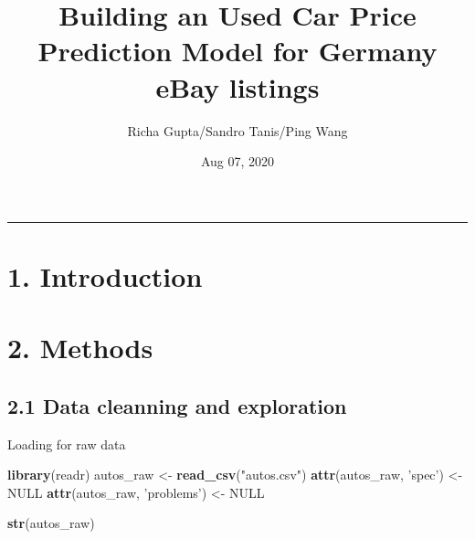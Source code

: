 \documentclass[]{article}
\title{Building an Used Car Price Prediction Model for Germany eBay listings}
\author{Richa Gupta/Sandro Tanis/Ping Wang}
\date{Aug 07, 2020}
\newenvironment{Shaded}{\begin{snugshade}}{\end{snugshade}}
\newcommand{\KeywordTok}[1]{\textcolor[rgb]{0.13,0.29,0.53}{\textbf{#1}}}
\newcommand{\NormalTok}[1]{#1}
\newcommand{\OtherTok}[1]{\textcolor[rgb]{0.56,0.35,0.01}{#1}}
\newcommand{\StringTok}[1]{\textcolor[rgb]{0.31,0.60,0.02}{#1}}
\begin{document}
\maketitle

\begin{center}\rule{0.5\linewidth}{\linethickness}\end{center}

\hypertarget{introduction}{%
\section{1. Introduction}\label{introduction}}

\hypertarget{methods}{%
\section{2. Methods}\label{methods}}

\hypertarget{data-cleanning-and-exploration}{%
\subsection{2.1 Data cleanning and
exploration}\label{data-cleanning-and-exploration}}

Loading for raw data

\begin{Shaded}
\begin{Highlighting}[]
\KeywordTok{library}\NormalTok{(readr)}
\NormalTok{autos_raw <-}\StringTok{ }\KeywordTok{read_csv}\NormalTok{(}\StringTok{"autos.csv"}\NormalTok{)}
\KeywordTok{attr}\NormalTok{(autos_raw, }\StringTok{'spec'}\NormalTok{) <-}\StringTok{ }\OtherTok{NULL}
\KeywordTok{attr}\NormalTok{(autos_raw, }\StringTok{'problems'}\NormalTok{) <-}\StringTok{ }\OtherTok{NULL}

\KeywordTok{str}\NormalTok{(autos_raw)}
\end{Highlighting}
\end{Shaded}
\end{document}
